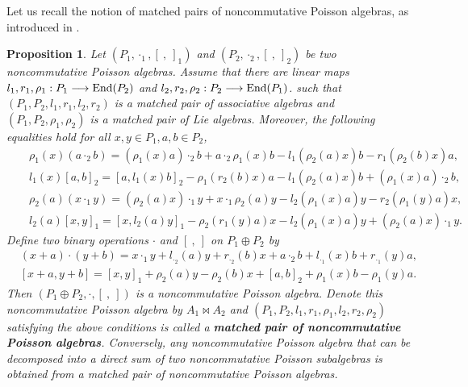 \documentclass[12pt]{amsart}
\newtheorem{pro}[thm]{Proposition}
\theoremstyle{definition}
\begin{document}
Let us recall the notion of matched pairs of noncommutative Poisson algebras, as introduced in \cite{Lbs}.

\begin{pro} \label{Df}
Let $(P_1,\cdot_1,[ \ , \ ]_{1})$ and $(P_2,\cdot_2,[ \ , \ ]_{2})$ be two noncommutative Poisson algebras. Assume that 
 there are linear maps $l_{1},r_{1},\rho_1:P_1\longrightarrow \hbox{End} (P_2)$ and $l_{2},r_{2},\rho_2:P_2\longrightarrow\hbox{End} (P_1)$.
 such that $(P_1,P_2,l_{1},r_{1},l_{2},r_{2})$ is a matched pair of associative algebras and
  $(P_1,P_2,\rho_1,\rho_2)$ is a matched pair of Lie algebras. Moreover,
  the following equalities hold for all $x,y\in P_1,a,b\in P_2$, 
\begin{eqnarray}&&
\label{MP1} \rho_1(x)(a\cdot_2 b)=(\rho_{1}(x)a)\cdot_2 b+a\cdot_2 \rho_{1}(x)b-l_{1}(\rho_2(a)x)b-r_{1}(\rho_2(b)x)a,\\&&
 \label{MP2} l_{1}(x)[a,b]_{2}=[a,l_{1}(x)b]_{2}-\rho_{1}(r_{2}(b) x)a-l_{1}(\rho_2(a)x)b+(\rho_{1}(x)a)\cdot_2 b,\\&&
\label{MP3}  \rho_2(a)(x\cdot_1 y)=(\rho_2(a)x)\cdot_1 y+x\cdot_1 \rho_2(a)y-l_{2}(\rho_{1}(x)a)y-r_{2}(\rho_{1}(y)a)x,\\&&
\label{MP4} l_{2}(a)[x,y]_{1}=[x,l_{2}(a) y]_{1}-\rho_2(r_{1}(y)a)x-l_{2}(\rho_1(x)a)y+(\rho_2(a)x)\cdot_1 y.
\end{eqnarray}
Define two binary operations $\cdot$ and $[ \ , \ ]$ on $P_1\oplus P_2$ by
\begin{align*}&(x+a)\cdot(y+b)=x\cdot_{1}y+l_{\cdot_2}(a)y+r_{\cdot_2}(b)x+a\cdot_{2}b+l_{\cdot_1}(x)b+r_{\cdot_1}(y)a,\\&
[x+a,y+b]=[x,y]_{1}+\rho_2(a)y-\rho_2(b)x+[a,b]_{2}+\rho_1(x)b-\rho_1(y)a.
\end{align*}
Then $(P_1\oplus P_2,\cdot,[ \ , \ ])$ is a noncommutative Poisson algebra.
Denote this noncommutative Poisson algebra by $A_1\bowtie A_2$ and
$(P_{1},P_{2},l_{1},r_{1},\rho_1,l_{2},r_{2},\rho_2)$
satisfying the above conditions is called a {\bf matched pair of
noncommutative Poisson algebras}. Conversely, any noncommutative Poisson algebra that can be decomposed into a
direct sum of two noncommutative Poisson subalgebras is obtained from a matched pair of noncommutative Poisson algebras.
\end{pro}
\end{document}
